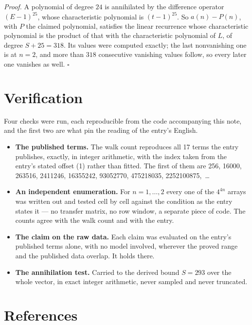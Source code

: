 \documentclass[11pt]{article}
\theoremstyle{definition}
\begin{document}
{\itshape Proof.} A polynomial of degree $24$ is annihilated by the difference operator $(E-1)^{25}$, whose characteristic polynomial is $(t-1)^{25}$. So $a(n) - P(n)$, with $P$ the claimed polynomial, satisfies the linear recurrence whose characteristic polynomial is the product of that with the characteristic polynomial of $L$, of degree $S + 25 = 318$. Its values were computed exactly; the last nonvanishing one is at $n = 2$, and more than $318$ consecutive vanishing values follow, so every later one vanishes as well. $\square$

\section{Verification}

Four checks were run, each reproducible from the code accompanying this note, and the first two are what pin the reading of the entry's English.

\begin{itemize}

\item {\bfseries The published terms.} The walk count reproduces all 17 terms the entry publishes, exactly, in integer arithmetic, with the index taken from the entry's stated offset (1) rather than fitted. The first of them are 256, 16000, 263516, 2411246, 16355242, 93052770, 475218035, 2252100875,~\dots

\item {\bfseries An independent enumeration.} For $n = 1,\dots,2$ every one of the $4^{4n}$ arrays was written out and tested cell by cell against the condition as the entry states it --- no transfer matrix, no row window, a separate piece of code. The counts agree with the walk count and with the entry.

\item {\bfseries The claim on the raw data.} Each claim was evaluated on the entry's published terms alone, with no model involved, wherever the proved range and the published data overlap. It holds there.

\item {\bfseries The annihilation test.} Carried to the derived bound $S = 293$ over the whole vector, in exact integer arithmetic, never sampled and never truncated.

\end{itemize}

\section{References}
\end{document}
